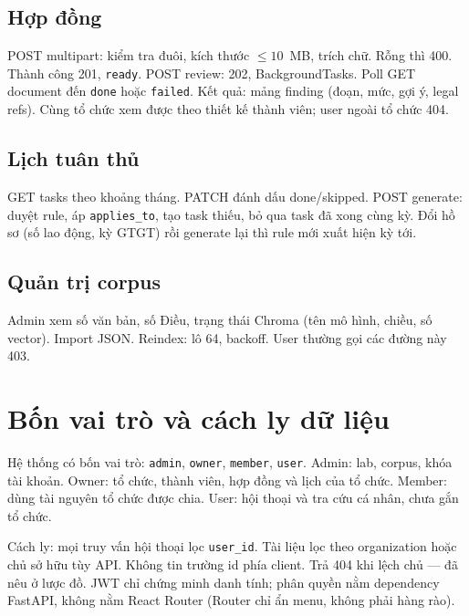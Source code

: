 \subsection{Hợp đồng}

POST multipart: kiểm tra đuôi, kích thước $\le 10$~MB, trích chữ. Rỗng thì 400.
Thành công 201, \texttt{ready}. POST review: 202, BackgroundTasks. Poll GET
document đến \texttt{done} hoặc \texttt{failed}. Kết quả: mảng finding (đoạn, mức,
gợi ý, legal refs). Cùng tổ chức xem được theo thiết kế thành viên; user ngoài
tổ chức 404.

\subsection{Lịch tuân thủ}

GET tasks theo khoảng tháng. PATCH đánh dấu done/skipped. POST generate: duyệt
rule, áp \texttt{applies\_to}, tạo task thiếu, bỏ qua task đã xong cùng kỳ. Đổi
hồ sơ (số lao động, kỳ GTGT) rồi generate lại thì rule mới xuất hiện kỳ tới.

\subsection{Quản trị corpus}

Admin xem số văn bản, số Điều, trạng thái Chroma (tên mô hình, chiều, số vector).
Import JSON. Reindex: lô 64, backoff. User thường gọi các đường này 403.

\section{Bốn vai trò và cách ly dữ liệu}

Hệ thống có bốn vai trò: \texttt{admin}, \texttt{owner}, \texttt{member},
\texttt{user}. Admin: lab, corpus, khóa tài khoản. Owner: tổ chức, thành viên,
hợp đồng và lịch của tổ chức. Member: dùng tài nguyên tổ chức được chia.
User: hội thoại và tra cứu cá nhân, chưa gắn tổ chức.

Cách ly: mọi truy vấn hội thoại lọc \texttt{user\_id}. Tài liệu lọc theo
organization hoặc chủ sở hữu tùy API. Không tin trường id phía client. Trả 404
khi lệch chủ --- đã nêu ở lược đồ. JWT chỉ chứng minh danh tính; phân quyền nằm
dependency FastAPI, không nằm React Router (Router chỉ ẩn menu, không phải hàng
rào).
